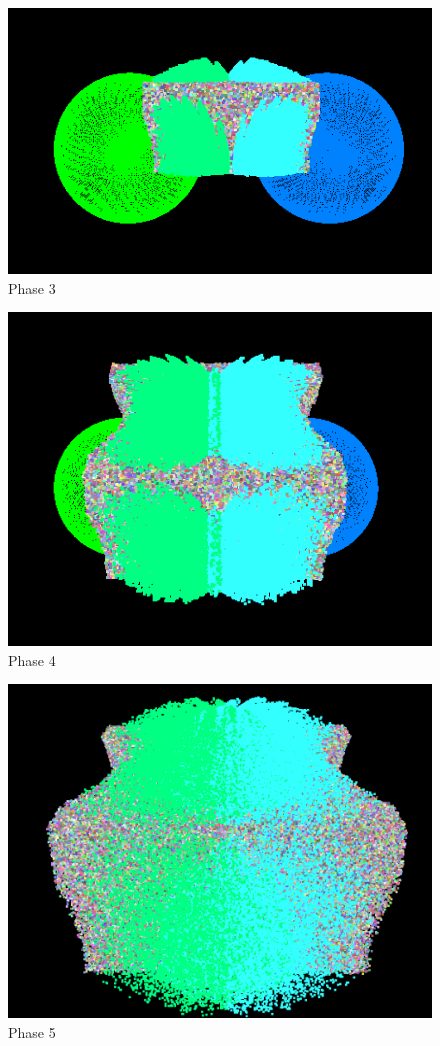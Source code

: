 \documentclass[onecolumn,draftclsnofoot, 10pt, compsoc]{IEEEtran}
\begin{document}
	\begin{figure}[H]
		\includegraphics[width=14cm]{pic3}
		\caption{Phase 3}
	\end{figure}
	\begin{figure}[H]
		\includegraphics[width=14cm]{pic4}
		\caption{Phase 4}
	\end{figure}

	\begin{figure}[H]
		\includegraphics[width=16cm]{pic5}
		\centering
		\caption{Phase 5}
	\end{figure}
	
\end{document}
